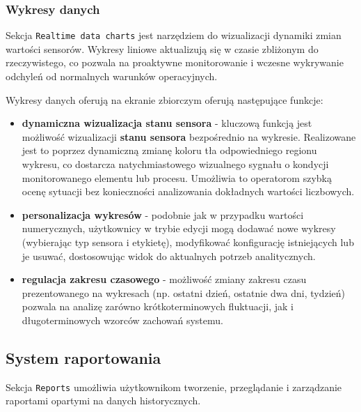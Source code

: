 \subsubsection{Wykresy danych}
Sekcja \texttt{Realtime data charts} jest narzędziem do wizualizacji dynamiki zmian wartości sensorów. Wykresy liniowe aktualizują się w czasie zbliżonym do rzeczywistego, co pozwala na proaktywne monitorowanie i wczesne wykrywanie odchyleń od normalnych warunków operacyjnych. 

\vspace{0.3em}

Wykresy danych oferują na ekranie zbiorczym oferują następujące funkcje:

\begin{itemize}
    \item \textbf{dynamiczna wizualizacja stanu sensora} - kluczową funkcją jest możliwość wizualizacji \textbf{stanu sensora} bezpośrednio na wykresie. Realizowane jest to poprzez dynamiczną zmianę koloru tła odpowiedniego regionu wykresu, co dostarcza natychmiastowego wizualnego sygnału o kondycji monitorowanego elementu lub procesu. Umożliwia to operatorom szybką ocenę sytuacji bez konieczności analizowania dokładnych wartości liczbowych.
    \item \textbf{personalizacja wykresów} - podobnie jak w przypadku wartości numerycznych, użytkownicy w trybie edycji mogą dodawać nowe wykresy (wybierając typ sensora i etykietę), modyfikować konfigurację istniejących lub je usuwać, dostosowując widok do aktualnych potrzeb analitycznych.
    \item \textbf{regulacja zakresu czasowego} - możliwość zmiany zakresu czasu prezentowanego na wykresach (np. ostatni dzień, ostatnie dwa dni, tydzień) pozwala na analizę zarówno krótkoterminowych fluktuacji, jak i długoterminowych wzorców zachowań systemu.
\end{itemize}


\newpage

\subsection{System raportowania}
Sekcja \texttt{Reports} umożliwia użytkownikom tworzenie, przeglądanie i zarządzanie raportami opartymi na danych historycznych.

